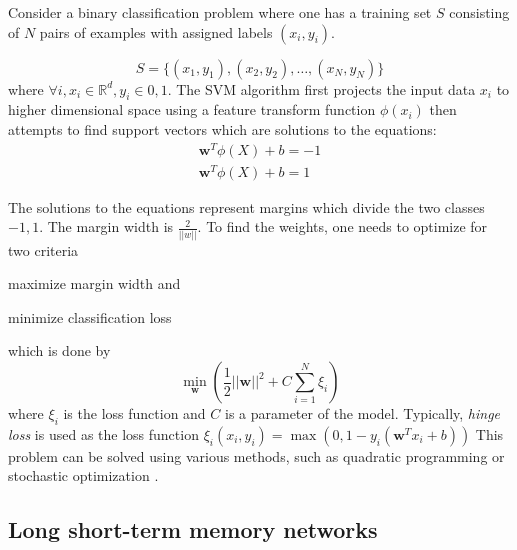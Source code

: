 Consider a binary classification problem where one has
a training set $S$ consisting of $N$ pairs of examples with assigned labels
$(x_i, y_i)$.

$$
S = \{(x_1, y_1), (x_2, y_2), \dots, (x_N, y_N)\}
$$
where $\forall i, x_i \in \mathbb{R}^d, y_i \in {0, 1}$.
The SVM algorithm first projects the input data $x_i$ to 
higher dimensional space using a 
feature transform function $\phi(x_i)$ then attempts to 
find support vectors which are solutions to the equations:
\begin{align*}
\textbf{w}^T \phi(X) + b = -1 \\
\textbf{w}^T \phi(X) + b = 1
\end{align*}

The solutions to the equations represent margins which divide
the two classes ${-1, 1}$.
The margin width is $\frac{2}{||w||}$. 
To find the weights, one needs to 
optimize for two criteria 
\begin{enumerate*}[label=(\arabic*)]
\item maximize margin width and
\item minimize classification loss
\end{enumerate*} which is done by
$$
\min_{\textbf{w}} \left( \frac{1}{2}||\textbf{w}||^2 + C \sum_{i=1}^{N} \xi_i \right)
$$
where $\xi_i$ is the loss function and $C$ is a parameter of the model.
Typically, \textit{hinge loss} is used as the loss function $\xi_i(x_i, y_i) =
\max(0, 1 - y_i(\textbf{w}^T x_i + b))$ This problem can be solved using
various methods, such as quadratic programming \citep{wu2005svm} or stochastic
optimization \citep{wang2012breaking}.


\subsection{Long short-term memory networks}
\label{sec:lstm}

